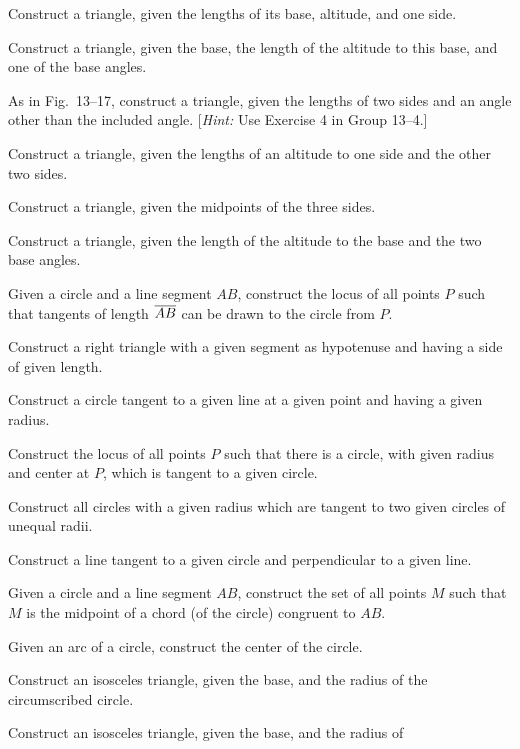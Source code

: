 \documentclass[11pt]{book}
\begin{document}
\begin{exercisecols}
\begin{exlist}
\item Construct a triangle, given the lengths of its base, altitude, and one
      side.
\item Construct a triangle, given the base, the length of the altitude to this
      base, and one of the base angles.
\item[\stex 3.] As in Fig.~13--17, construct a triangle, given the lengths of
      two sides and an angle other than the included angle. [\emph{Hint:} Use
      Exercise 4 in Group 13--4.]
\exfig{\FIGXIIISEVENTEEN}
\item[4.] Construct a triangle, given the lengths of an altitude to one side and
      the other two sides.
\item[5.] Construct a triangle, given the midpoints of the three sides.
\item[6.] Construct a triangle, given the length of the altitude to the base and
      the two base angles.
\item[7.] Given a circle and a line segment $AB$, construct the locus of all
      points $P$ such that tangents of length $\overline{AB}$ can be drawn to the
      circle from $P$.
\item[8.] Construct a right triangle with a given segment as hypotenuse and
      having a side of given length.
\item[9.] Construct a circle tangent to a given line at a given point and having
      a given radius.
\item[10.] Construct the locus of all points $P$ such that there is a circle,
      with given radius and center at $P$, which is tangent to a given circle.
\item[11.] Construct all circles with a given radius which are tangent to two
      given circles of unequal radii.
\item[12.] Construct a line tangent to a given circle and perpendicular to a
      given line.
\item[13.] Given a circle and a line segment $AB$, construct the set of all
      points $M$ such that $M$ is the midpoint of a chord (of the circle)
      congruent to $AB$.
\item[14.] Given an arc of a circle, construct the center of the circle.
\item[15.] Construct an isosceles triangle, given the base, and the radius of
      the circumscribed circle.
\item[16.] Construct an isosceles triangle, given the base, and the radius of

\end{exlist}
\end{exercisecols}
\end{document}
